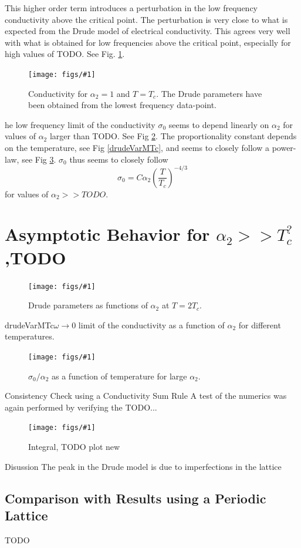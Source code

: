 \documentclass[12pt]{report}
\newcommand{\fig}[3]{
\begin{figure}
\centering
\texttt{[image: figs/\#1]}
\caption{#2}
\end{figure}
}
\begin{document}
This higher order term introduces a perturbation in the low frequency conductivity above the critical point. The perturbation is very close to what is expected from the Drude model of electrical conductivity. 
This agrees very well with what is obtained for low frequencies above the critical point, especially for high values of TODO. See Fig. \ref{drude}.




\fig{drude_T_1Tc_a2_1}{Conductivity for $\alpha_2=1$ and $T=T_c$. The Drude parameters have been obtained from the lowest frequency data-point. \label{drude}}

The low frequency limit of the conductivity $\sigma_0$ seems to depend linearly on $\alpha_2$ for values of $\alpha_2$ larger than TODO. See Fig \ref{drudeVar2Tc}. The proportionality constant depends on the temperature, see Fig \ref{drudeVarMTc}, and seems to closely follow a power-law, see Fig \ref{drudeTdep_1e4}. $\sigma_0$ thus seems to closely follow
\begin{equation}
 \sigma_0=C\alpha_2\left(\frac{T}{T_c}\right)^{-4/3}
\end{equation}
for values of $\alpha_2>>TODO$.


\section{Asymptotic Behavior for $\alpha_2>>T_c^?$,TODO}
\fig{drudeVar2Tc}{Drude parameters as functions of $\alpha_2$ at $T=2T_c$.\label{drudeVar2Tc}}

\fig{drudeVarMTc}{$\omega\rightarrow0$ limit of the conductivity as a function of $\alpha_2$ for different temperatures.\label{drudeVarMTc}}

\fig{drudeTdep_1e4}{$\sigma_0/\alpha_2$ as a function of temperature for large $\alpha_2$.\label{drudeTdep_1e4}}
\section{Consistency Check using a Conductivity Sum Rule}
A test of the numerics was again performed by verifying the TODO...
\fig{sum_rule_a20}{Integral, TODO plot new}

\section{Disussion}
The peak in the Drude model is due to imperfections in the lattice
\subsection{Comparison with Results using a Periodic Lattice}
TODO
\end{document}
